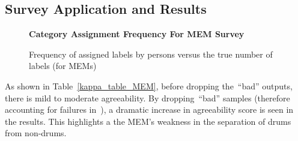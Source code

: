 \documentclass[\main/thesis.tex]{subfiles}
\begin{document}
 \subsection{Survey Application and Results}
 \begin{table}[tbp]
\caption{\label{kappa_table_MEM}Table of Fleiss' kappa coefficient to measure the degree of agreement between persons (HvH) and persons and MEM. We measure the agreeability scores after dropping bad samples if both or either persons assigned the sample as such. We also measure agreeability when all samples deemed \enquote{Bad} or \enquote{other} by either person are removed.}
\end{table}

\begin{figure}[tpb]
    \begin{center}
    \textbf{Category Assignment Frequency For MEM Survey}
    \end{center}
    \caption{Frequency of assigned labels by persons versus the true number of labels (for MEMs)}
\label{fig:freq-survey-2p}
\end{figure} 

 As shown in Table~\ref{kappa_table_MEM}, before dropping the~\enquote{bad} outputs, there is mild to moderate agreeability. By dropping~\enquote{bad} samples (therefore accounting for failures in~\decfirst), a dramatic increase in agreeability score is seen in the results.  This highlights a the MEM's weakness in the separation of drums from non-drums. 
\end{document}
